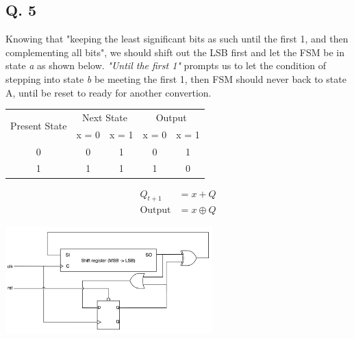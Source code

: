 \documentclass[onecolumn, oneside, ctexart]{SUSTechHomework}
\begin{document}
\subsection*{Q. 5}
Knowing that "keeping the least significant bits as such until the first 1, and then complementing all bits", we should shift out the LSB first and let the FSM be in state \emph{a} as shown below. \textit{"Until the first 1"} prompts us to let the condition of stepping into state \emph{b} be meeting the first 1, then FSM should never back to state A, until be reset to ready for another convertion.
\begin{center}
\end{center}

\begin{longtable}[c]{c|cc|cc}
\hline
\multirow{2}{*}{Present State} & \multicolumn{2}{c|}{Next State} & \multicolumn{2}{c}{Output} \\ \cline{2-5} 
                               & x = 0          & x = 1          & x = 0        & x = 1       \\ \hline
\endfirsthead
%
\endhead
%
0                              & 0              & 1              & 0            & 1           \\
1                              & 1              & 1              & 1            & 0          \\ \hline
\end{longtable}
\vspace{-3em}
\begin{align*}
Q_{t+1}&=x+Q\\
\text{Output}&=x\oplus Q
\end{align*}
\centerline{\includegraphics[width=0.6\textwidth]{fig/q5}}
\end{document}
